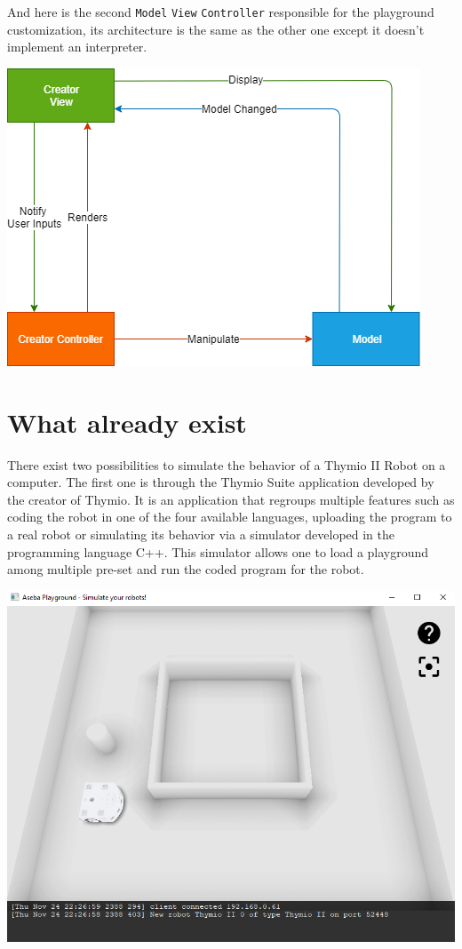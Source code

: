 \documentclass{scrbook}
\begin{document}
And here is the second \texttt{Model} \texttt{View} \texttt{Controller} responsible for the playground customization, its architecture is the same as the other one except it doesn't implement an interpreter. 

\begin{center}
  \includegraphics[width=\textwidth]{./architecture_proposal-Page-2}
\end{center}

\chapter{What already exist} 

There exist two possibilities to simulate the behavior of a Thymio II Robot on a computer. 
The first one is through the Thymio Suite application developed by the creator of Thymio. 
It is an application that regroups multiple features such as coding the robot in one of the four available languages, 
uploading the program to a real robot or simulating its behavior via a simulator developed in the programming language C++. 
This simulator allows one to load a playground among multiple pre-set and run the coded program for the robot.

\begin{center}
  \includegraphics[width=\textwidth]{./suite_simulator}
\end{center}
\end{document}
